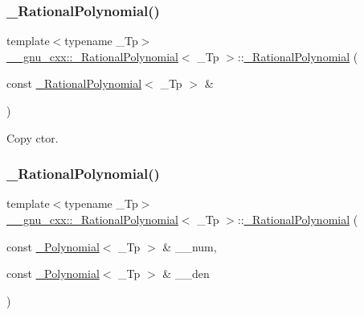 \subsubsection{\texorpdfstring{\+\_\+\+Rational\+Polynomial()}{\_RationalPolynomial()}\hspace{0.1cm}{\footnotesize\ttfamily [2/3]}}
{\footnotesize\ttfamily template$<$typename \+\_\+\+Tp$>$ \\
\hyperlink{class____gnu__cxx_1_1__RationalPolynomial}{\+\_\+\+\_\+gnu\+\_\+cxx\+::\+\_\+\+Rational\+Polynomial}$<$ \+\_\+\+Tp $>$\+::\hyperlink{class____gnu__cxx_1_1__RationalPolynomial}{\+\_\+\+Rational\+Polynomial} (\begin{DoxyParamCaption}\item[{const \hyperlink{class____gnu__cxx_1_1__RationalPolynomial}{\+\_\+\+Rational\+Polynomial}$<$ \+\_\+\+Tp $>$ \&}]{ }\end{DoxyParamCaption})\hspace{0.3cm}{\ttfamily [default]}}

Copy ctor. \mbox{\label{class____gnu__cxx_1_1__RationalPolynomial_aef1f631e89bdeb2976b0629591e4e61e}} 
\subsubsection{\texorpdfstring{\+\_\+\+Rational\+Polynomial()}{\_RationalPolynomial()}\hspace{0.1cm}{\footnotesize\ttfamily [3/3]}}
{\footnotesize\ttfamily template$<$typename \+\_\+\+Tp$>$ \\
\hyperlink{class____gnu__cxx_1_1__RationalPolynomial}{\+\_\+\+\_\+gnu\+\_\+cxx\+::\+\_\+\+Rational\+Polynomial}$<$ \+\_\+\+Tp $>$\+::\hyperlink{class____gnu__cxx_1_1__RationalPolynomial}{\+\_\+\+Rational\+Polynomial} (\begin{DoxyParamCaption}\item[{const \hyperlink{class____gnu__cxx_1_1__Polynomial}{\+\_\+\+Polynomial}$<$ \+\_\+\+Tp $>$ \&}]{\+\_\+\+\_\+num,  }\item[{const \hyperlink{class____gnu__cxx_1_1__Polynomial}{\+\_\+\+Polynomial}$<$ \+\_\+\+Tp $>$ \&}]{\+\_\+\+\_\+den }\end{DoxyParamCaption})\hspace{0.3cm}{\ttfamily [inline]}}



